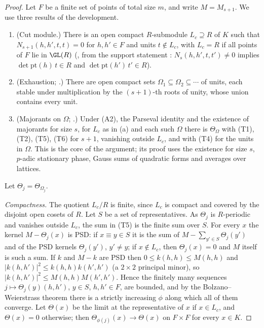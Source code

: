\begin{proof}
Let $F$ be a finite set of points of total size $m$, and write $M=M_{s+1}$. We use three results of the development.
\begin{enumerate}[label=(\alph*)]
\item (Cut module.) There is an open compact $R$-submodule $L_c\supseteq R$ of $K$ such that $N_{s+1}(h,h',t,t)=0$ for
$h,h'\in F$ and units $t\notin L_c$, with $L_c=R$ if all points of $F$ lie in $\GL(R)$
(, from the support statement
: $N_s(h,h',t,t')\ne0$ implies $\det\mathrm{pt}(h)\,t\in R$
and $\det\mathrm{pt}(h')\,t'\in R$).
\item (Exhaustion; .) There are open compact sets
$\Omega_1\subseteq\Omega_2\subseteq\cdots$ of units, each stable under multiplication by the $(s+1)$-th roots of unity, whose union
contains every unit.
\item (Majorants on $\Omega$; .) Under (A2), the Parseval identity and
the existence of majorants for size $s$, for $L_c$ as in (a) and each such $\Omega$ there is $\Theta_\Omega$ with (T1), (T2),
(T5), (T6) for $s+1$, vanishing outside $L_c$, and with (T4) for the units in $\Omega$. This is the core of the argument; its
proof uses the existence for size $s$, $p$-adic stationary phase, Gauss sums of quadratic forms and averages over lattices.
\end{enumerate}
Let $\Theta_j=\Theta_{\Omega_j}$.

\emph{Compactness.} The quotient $L_c/R$ is finite, since $L_c$ is compact and covered by the disjoint open cosets of $R$. Let $S$
be a set of representatives. As $\Theta_j$ is $R$-periodic and vanishes outside $L_c$, the sum in (T5) is the finite sum over
$S$. For every $x$ the kernel $M-\Theta_j(x)$ is PSD: if $x\equiv y\in S$ it is the sum of $M-\sum_{y'\in S}\Theta_j(y')$ and of
the PSD kernels $\Theta_j(y')$, $y'\ne y$; if $x\notin L_c$, then $\Theta_j(x)=0$ and $M$ itself is such a sum. If $k$ and $M-k$
are PSD then $0\le k(h,h)\le M(h,h)$ and $|k(h,h')|^2\le k(h,h)k(h',h')$ (a $2\times2$ principal minor), so
$|k(h,h')|^2\le M(h,h)M(h',h')$. Hence the finitely many sequences $j\mapsto\Theta_j(y)(h,h')$, $y\in S$, $h,h'\in F$, are
bounded, and by the Bolzano--Weierstrass theorem there is a strictly increasing $\phi$ along which all of them converge. Let
$\Theta(x)$ be the limit at the representative of $x$ if $x\in L_c$, and $\Theta(x)=0$ otherwise; then
$\Theta_{\phi(j)}(x)\to\Theta(x)$ on $F\times F$ for every $x\in K$.


\end{proof}
